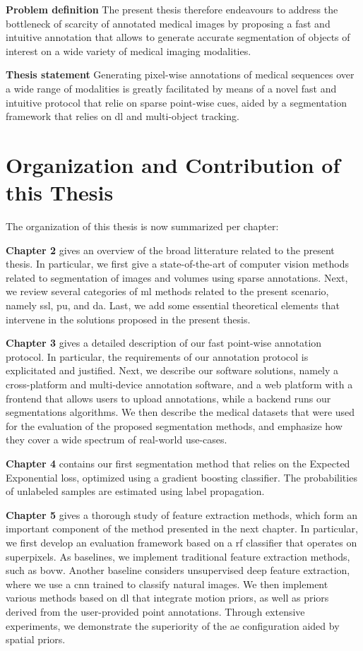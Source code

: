 \textbf{Problem definition}
The present thesis therefore endeavours to address the bottleneck of scarcity of annotated medical images by proposing a fast and intuitive annotation that allows to generate accurate segmentation of objects of interest on a wide variety of medical imaging modalities.

\textbf{Thesis statement}
Generating pixel-wise annotations of medical sequences over a wide range of modalities is greatly facilitated by means of a novel fast and intuitive protocol that relie on sparse point-wise cues, aided by a segmentation framework that relies on \gls{dl} and multi-object tracking.

\section{Organization and Contribution of this Thesis}
The organization of this thesis is now summarized per chapter:

\textbf{Chapter 2} gives an overview of the broad litterature related to the present thesis.
In particular, we first give a state-of-the-art of computer vision methods related to segmentation of images and volumes using sparse annotations.
Next, we review several categories of \gls{ml} methods related to the present scenario, namely \gls{ssl}, \gls{pu}, and \gls{da}.
Last, we add some essential theoretical elements that intervene in the solutions proposed in the present thesis.

\textbf{Chapter 3} gives a detailed description of our fast point-wise annotation protocol.
In particular, the requirements of our annotation protocol is explicitated and justified.
Next, we describe our software solutions, namely a cross-platform and multi-device annotation software, and a web platform with a frontend that allows users to upload annotations, while a backend runs our segmentations algorithms.
We then describe the medical datasets that were used for the evaluation of the proposed segmentation methods, and emphasize how they cover a wide spectrum of real-world use-cases.

\textbf{Chapter 4} contains our first segmentation method that relies on the Expected Exponential loss, optimized using a gradient boosting classifier. The probabilities of unlabeled samples are estimated using label propagation.

\textbf{Chapter 5} gives a thorough study of feature extraction methods, which form an important component of the method presented in the next chapter.
In particular, we first develop an evaluation framework based on a \gls{rf} classifier that operates on superpixels.
As baselines, we implement traditional feature extraction methods, such as \gls{bovw}.
Another baseline considers unsupervised deep feature extraction, where we use a \gls{cnn} trained to classify natural images.
We then implement various methods based on \gls{dl} that integrate motion priors, as well as priors derived from the user-provided point annotations.
Through extensive experiments, we demonstrate the superiority of the \gls{ae} configuration aided by spatial priors.

